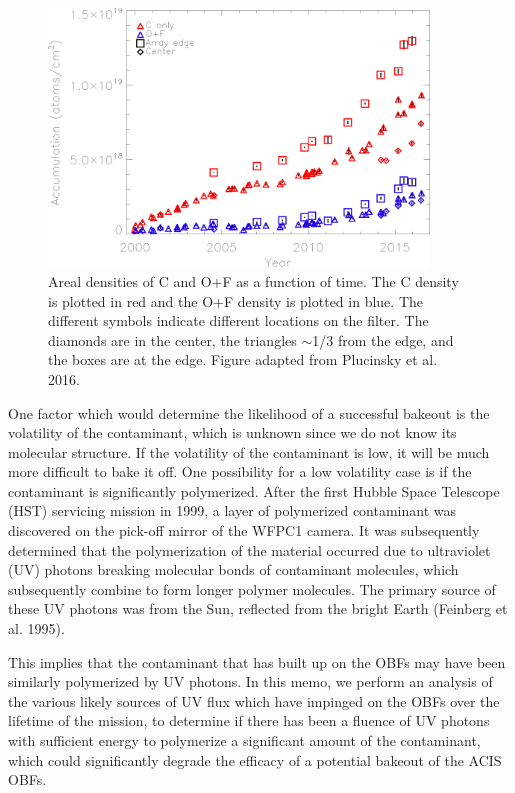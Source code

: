\documentclass[11pt]{article}
\begin{document}
\begin{figure}
\begin{center}
\includegraphics[width=0.9\textwidth]{areal_density.eps}
\caption{Areal densities of C and O+F as a function of time. The C density is plotted
in red and the O+F density is plotted in blue. The different symbols indicate different
locations on the filter. The diamonds are in the center, the triangles $\sim$1/3 from
the edge, and the boxes are at the edge. Figure adapted from Plucinsky et al. 2016.\label{fig:areal_density}}
\end{center}
\end{figure}

One factor which would determine the likelihood of a successful bakeout is the volatility
of the contaminant, which is unknown since we do not know its molecular structure. If the
volatility of the contaminant is low, it will be much more difficult to bake it off. One
possibility for a low volatility case is if the contaminant is significantly polymerized.
After the first Hubble Space Telescope (HST) servicing mission in 1999, a layer of polymerized
contaminant was discovered on the pick-off mirror of the WFPC1 camera. It was subsequently
determined that the polymerization of the material occurred due to ultraviolet (UV) photons
breaking molecular bonds of contaminant molecules, which subsequently combine to form longer
polymer molecules. The primary source of these UV photons was from the Sun, reflected from
the bright Earth (Feinberg et al. 1995).

This implies that the contaminant that has built up on the OBFs may have been similarly
polymerized by UV photons. In this memo, we perform an analysis of the various likely
sources of UV flux which have impinged on the OBFs over the lifetime of the mission,
to determine if there has been a fluence of UV photons with sufficient energy to polymerize
a significant amount of the contaminant, which could significantly degrade the efficacy
of a potential bakeout of the ACIS OBFs.
\end{document}
